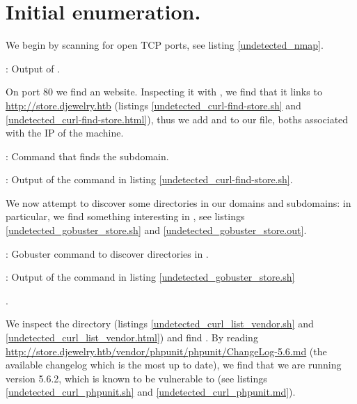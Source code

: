 \section{Initial enumeration.}
\par We begin by scanning  for open TCP ports, see listing \ref{undetected_nmap}.
\begin{listing}
  \small
	
	\caption{: Output of .}
	\label{undetected_nmap}
\end{listing}
\par On port 80 we find an  website. Inspecting it with , we find that it links to \url{http://store.djewelry.htb} (listings \ref{undetected_curl-find-store.sh} and \ref{undetected_curl-find-store.html}), thus we add  and  to our  file, boths associated with the IP of the machine.
\begin{listing}
	\caption{: Command that finds the  subdomain.}
	\label{undetected_curl-find-store.sh}
\end{listing}
\begin{listing}
  \tiny
	\caption{: Output of the command in listing \ref{undetected_curl-find-store.sh}.}
	\label{undetected_curl-find-store.html}
\end{listing}
\par We now attempt to discover some directories in our domains and subdomains: in particular, we find something interesting in , see listings \ref{undetected_gobuster_store.sh} and \ref{undetected_gobuster_store.out}.
\begin{listing}
  \small
	\caption{: Gobuster command to discover directories in .}
	\label{undetected_gobuster_store.sh}
\end{listing}
\begin{listing}
	
	\caption{: Output of the command in listing \ref{undetected_gobuster_store.sh}}.
	\label{undetected_gobuster_store.out}
\end{listing}
\par We inspect the  directory (listings \ref{undetected_curl_list_vendor.sh} and \ref{undetected_curl_list_vendor.html}) and find . By reading \url{http://store.djewelry.htb/vendor/phpunit/phpunit/ChangeLog-5.6.md} (the available changelog which is the most up to date), we find that we are running version 5.6.2, which is known to be vulnerable to  (see listings \ref{undetected_curl_phpunit.sh} and \ref{undetected_curl_phpunit.md}).
